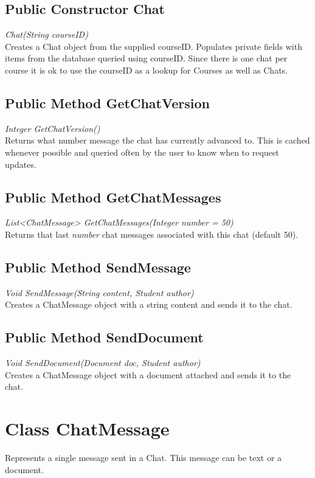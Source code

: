 \documentclass[16pt]{scrreprt}
\begin{document}
\subsection{Public Constructor Chat}
\textit{Chat(String courseID)} \\
Creates a Chat object from the supplied courseID. Populates private fields with items from the database queried using courseID. Since there is one chat per course it is ok to use the courseID as a lookup for Courses as well as Chats.

\subsection{Public Method GetChatVersion}
\textit{Integer GetChatVersion()} \\
Returns what number message the chat has currently advanced to. This is cached whenever possible and queried often by the user to know when to request updates.

\subsection{Public Method GetChatMessages}
\textit{List<ChatMessage> GetChatMessages(Integer number = 50)} \\
Returns that last \textit{number} chat messages associated with this chat (default 50).

\subsection{Public Method SendMessage}
\textit{Void SendMessage(String content, Student author)} \\
Creates a ChatMessage object with a string content and sends it to the chat.

\subsection{Public Method SendDocument}
\textit{Void SendDocument(Document doc, Student author)} \\
Creates a ChatMessage object with a document attached and sends it to the chat.

\section{Class ChatMessage}
Represents a single message sent in a Chat. This message can be text or a document.
\end{document}
